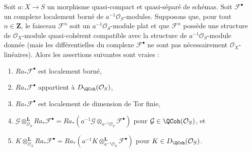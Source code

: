 \begin{lemma}
\label{lemma-cohomology-de-rham-base-change}
Soit $a : X \to S$ un morphisme quasi-compact et quasi-séparé
de schémas. Soit $\mathcal{F}^\bullet$ un complexe localement borné
de $a^{-1}\mathcal{O}_S$-modules. Supposons que, pour tout $n \in \mathbf{Z}$,
le faisceau $\mathcal{F}^n$ soit un $a^{-1}\mathcal{O}_S$-module plat et que
$\mathcal{F}^n$ possède une structure de $\mathcal{O}_X$-module quasi-cohérent
compatible avec la structure de $a^{-1}\mathcal{O}_S$-module donnée (mais les
différentielles du complexe $\mathcal{F}^\bullet$ ne sont pas nécessairement
$\mathcal{O}_X$-linéaires). Alors les assertions suivantes sont vraies :
\begin{enumerate}
\item $Ra_*\mathcal{F}^\bullet$ est localement borné,
\item $Ra_*\mathcal{F}^\bullet$ appartient à $D_\QCoh(\mathcal{O}_S)$,
\item $Ra_*\mathcal{F}^\bullet$ est localement de dimension de Tor finie,
\item $\mathcal{G} \otimes_{\mathcal{O}_S}^\mathbf{L} Ra_*\mathcal{F}^\bullet =
Ra_*(a^{-1}\mathcal{G} \otimes_{a^{-1}\mathcal{O}_S} \mathcal{F}^\bullet)$
pour $\mathcal{G} \in \QCoh(\mathcal{O}_S)$, et
\item $K \otimes_{\mathcal{O}_S}^\mathbf{L} Ra_*\mathcal{F}^\bullet =
Ra_*(a^{-1}K \otimes_{a^{-1}\mathcal{O}_S}^\mathbf{L} \mathcal{F}^\bullet)$
pour $K \in D_\QCoh(\mathcal{O}_S)$.
\end{enumerate}
\end{lemma}


